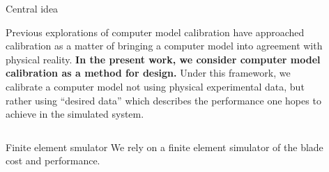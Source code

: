 \documentclass[final]{beamer}
\newlength{\sepwid}
\newlength{\onecolwid}
\newlength{\twocolwid}
\begin{document}
\begin{frame}[t]
\begin{columns}[t]
\begin{column}{\onecolwid}

\end{column} %



\begin{column}{\sepwid}\end{column} %

\begin{column}{\twocolwid} %


\begin{alertblock}{Central idea}

Previous explorations of computer model calibration have approached calibration as a matter of bringing a computer model into agreement with physical reality\cite{Bayarri2007,Kennedy2001,Higdon2004,Williams2006}. \textbf{In the present work, we consider computer model calibration as a method for design.} Under this framework, we calibrate a computer model not using physical experimental data, but rather using ``desired data'' which describes the performance one hopes to achieve in the simulated system. 

\end{alertblock} 


\begin{columns}[t,totalwidth=\twocolwid] %

\begin{column}{\onecolwid}\vspace{-.6in} %


\begin{alertblock}{Finite element smulator}
We rely on a finite element simulator of the blade cost and performance.


\end{alertblock}
\end{column}
\end{columns}
\end{column}
\end{columns}
\end{frame}
\end{document}

